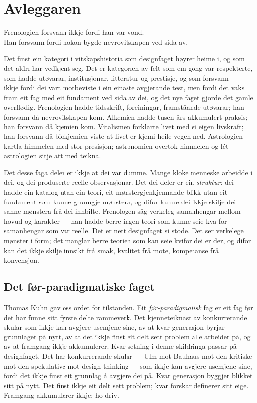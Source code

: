 \chapter{Avleggaren}

\begin{motto}
Frenologien forsvann ikkje fordi han var vond.\\ Han forsvann fordi nokon bygde nevrovitskapen ved sida av.
\end{motto}

Det finst ein kategori i vitskapshistoria som designfaget høyrer heime i, og som det aldri har vedkjent seg. Det er kategorien av felt som ein gong var respekterte, som hadde utøvarar, institusjonar, litteratur og prestisje, og som forsvann — ikkje fordi dei vart motbeviste i ein einaste avgjerande test, men fordi det vaks fram eit fag med eit fundament ved sida av dei, og det nye faget gjorde det gamle overflødig. Frenologien hadde tidsskrift, foreiningar, framståande utøvarar; han forsvann då nevrovitskapen kom. Alkemien hadde tusen års akkumulert praksis; han forsvann då kjemien kom. Vitalismen forklarte livet med ei eigen livskraft; han forsvann då biokjemien viste at livet er kjemi heile vegen ned. Astrologien kartla himmelen med stor presisjon; astronomien overtok himmelen og lét astrologien sitje att med teikna.

Det desse faga deler er ikkje at dei var dumme. Mange kloke menneske arbeidde i dei, og dei produserte reelle observasjonar. Det dei deler er ein \emph{struktur}: dei hadde ein katalog utan ein teori, eit mønstergjenkjennande blikk utan eit fundament som kunne grunngje mønstera, og difor kunne dei ikkje skilje dei sanne mønstera frå dei innbilte. Frenologen såg verkeleg samanhengar mellom hovud og karakter — han hadde berre ingen teori som kunne seie kva for samanhengar som var reelle. Det er nett designfaget si stode. Det ser verkelege mønster i form; det manglar berre teorien som kan seie kvifor dei er der, og difor kan det ikkje skilje innsikt frå smak, kvalitet frå mote, kompetanse frå konvensjon.

\section{Det før-paradigmatiske faget}

Thomas Kuhn gav oss ordet for tilstanden. Eit \emph{før-paradigmatisk} fag er eit fag før det har funne sitt fyrste delte rammeverk. Det kjenneteiknast av konkurrerande skular som ikkje kan avgjere usemjene sine, av at kvar generasjon byrjar grunnlaget på nytt, av at det ikkje finst eit delt sett problem alle arbeider på, og av at framgang ikkje akkumulerer. Kvar setning i denne skildringa passar på designfaget. Det har konkurrerande skular — Ulm mot Bauhaus mot den kritiske mot den spekulative mot design thinking — som ikkje kan avgjere usemjene sine, fordi det ikkje finst eit grunnlag å avgjere dei på. Kvar generasjon byggjer blikket sitt på nytt. Det finst ikkje eit delt sett problem; kvar forskar definerer sitt eige. Framgang akkumulerer ikkje; ho driv.

